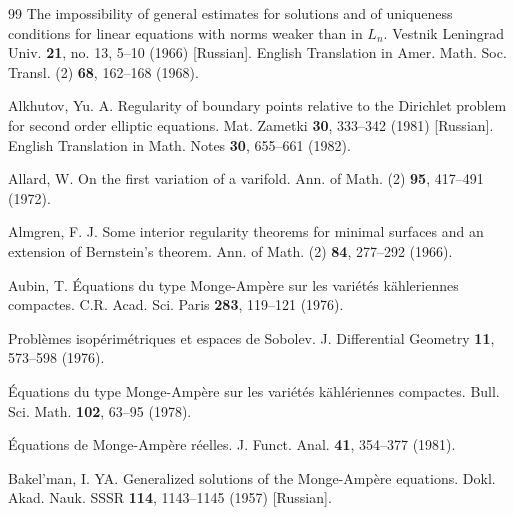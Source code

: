 \begin{thebibliography}{99}
The impossibility of general estimates for solutions and of uniqueness conditions for linear
equations with norms weaker than in $L_n$. Vestnik Leningrad Univ. \textbf{21}, no. 13, 5--10 (1966)
[Russian]. English Translation in Amer. Math. Soc. Transl. (2) \textbf{68}, 162--168 (1968).

Alkhutov, Yu. A.
Regularity of boundary points relative to the Dirichlet problem for second order elliptic
equations. Mat. Zametki \textbf{30}, 333--342 (1981) [Russian]. English Translation in Math. Notes
\textbf{30}, 655--661 (1982).

Allard, W.
On the first variation of a varifold. Ann. of Math. (2) \textbf{95}, 417--491 (1972).

Almgren, F. J.
Some interior regularity theorems for minimal surfaces and an extension of Bernstein's
theorem. Ann. of Math. (2) \textbf{84}, 277--292 (1966).

Aubin, T.
\'{E}quations du type Monge-Amp\`ere sur les vari\'et\'es k\"ahleriennes compactes. C.R. Acad.
Sci. Paris \textbf{283}, 119--121 (1976).

Probl\`emes isop\'erim\'etriques et espaces de Sobolev. J. Differential Geometry \textbf{11}, 573--598
(1976).

\'{E}quations du type Monge-Amp\`ere sur les vari\'et\'es k\"ahl\'eriennes compactes. Bull. Sci. Math.
\textbf{102}, 63--95 (1978).

\'{E}quations de Monge-Amp\`ere r\'eelles. J. Funct. Anal. \textbf{41}, 354--377 (1981).

Bakel'man, I. YA.
Generalized solutions of the Monge-Amp\`ere equations. Dokl. Akad. Nauk. SSSR \textbf{114},
1143--1145 (1957) [Russian].

\end{thebibliography}
